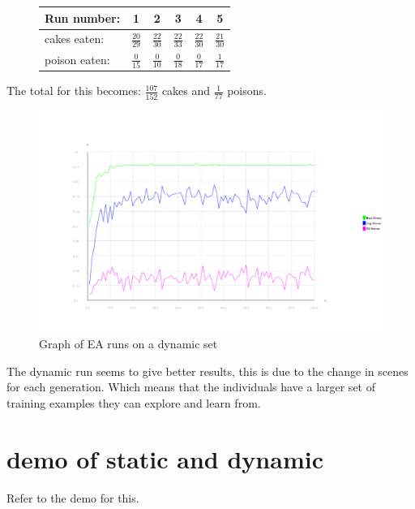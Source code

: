\documentclass[12pt, a4paper]{article}
\begin{document}
\begin{figure}[H]
	\begin{center}
	\begin{tabular}{l| c|c|c|c|c}
	Run number: &  1&2 &3 &4 &5 \\ \hline
cakes eaten: &$ \frac{20}{29} $ &$ \frac{22}{30} $ &$ \frac{22}{33} $ &$ \frac{22}{30} $ &$ \frac{21}{30} $ \\ \hline
poison eaten: &$ \frac{0}{15} $ &$ \frac{0}{10} $ &$ \frac{0}{18} $ &$ \frac{0}{17} $ &$ \frac{1}{17} $ \\ \hline
	\end{tabular}
	\end{center}
\end{figure}
The total for this becomes: $ \frac{107}{152} $ cakes and $ \frac{1}{77} $ poisons.  
\begin{figure}[H]
\includegraphics[width=0.8\linewidth]{flatlandfalse}
\caption{Graph of EA runs on a dynamic set}
\end{figure}

The dynamic run seems to give better results, this is due to the change in scenes for each generation. Which means that the individuals have a larger set of training examples they can explore and learn from.
\section{demo of static and dynamic}
Refer to the demo for this.
\end{document}
